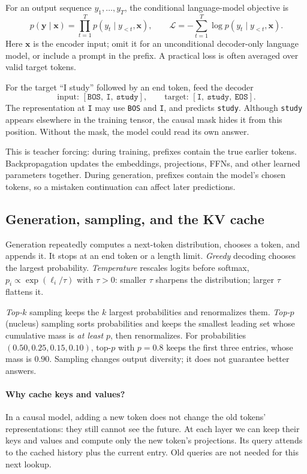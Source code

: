 \documentclass[11pt, oneside]{book}
\newcommand{\loss}{\mathcal{L}}          %
\newcommand{\params}{\boldsymbol{\theta}}   %
\let\originalsubsection\subsection
\renewcommand{\subsection}{\Needspace{6\baselineskip}\originalsubsection}
\begin{document}
For an output sequence $y_1,\ldots,y_T$, the conditional language-model objective is
\[
 p(\mathbf{y}\mid\mathbf{x})=\prod_{t=1}^T p(y_t\mid y_{<t},\mathbf{x}),\qquad
 \loss=-\sum_{t=1}^T\log p(y_t\mid y_{<t},\mathbf{x}).
\]
Here $\mathbf{x}$ is the encoder input; omit it for an unconditional decoder-only language model, or include a prompt in the prefix. A practical loss is often averaged over valid target tokens.

\begin{exbox}[title={What exactly is shifted?}]
For the target ``I study'' followed by an end token, feed the decoder
\[
 \text{input: }[\texttt{BOS},\ \texttt{I},\ \texttt{study}],\qquad
 \text{target: }[\texttt{I},\ \texttt{study},\ \texttt{EOS}].
\]
The representation at \texttt{I} may use \texttt{BOS} and \texttt{I}, and predicts \texttt{study}. Although \texttt{study} appears elsewhere in the training tensor, the causal mask hides it from this position. Without the mask, the model could read its own answer.
\end{exbox}

This is teacher forcing: during training, prefixes contain the true earlier tokens. Backpropagation updates the embeddings, projections, FFNs, and other learned parameters together. During generation, prefixes contain the model's chosen tokens, so a mistaken continuation can affect later predictions.

\subsection*{Generation, sampling, and the KV cache}
Generation repeatedly computes a next-token distribution, chooses a token, and appends it. It stops at an end token or a length limit. \emph{Greedy} decoding chooses the largest probability. \emph{Temperature} rescales logits before softmax, $p_i\propto\exp(\ell_i/\tau)$ with $\tau>0$: smaller $\tau$ sharpens the distribution; larger $\tau$ flattens it.

\emph{Top-$k$} sampling keeps the $k$ largest probabilities and renormalizes them. \emph{Top-$p$} (nucleus) sampling sorts probabilities and keeps the smallest leading set whose cumulative mass is \emph{at least} $p$, then renormalizes. For probabilities $(0.50,0.25,0.15,0.10)$, top-$p$ with $p=0.8$ keeps the first three entries, whose mass is $0.90$. Sampling changes output diversity; it does not guarantee better answers.

\paragraph{Why cache keys and values?} In a causal model, adding a new token does not change the old tokens' representations: they still cannot see the future. At each layer we can keep their keys and values and compute only the new token's projections. Its query attends to the cached history plus the current entry. Old queries are not needed for this next lookup.
\end{document}
